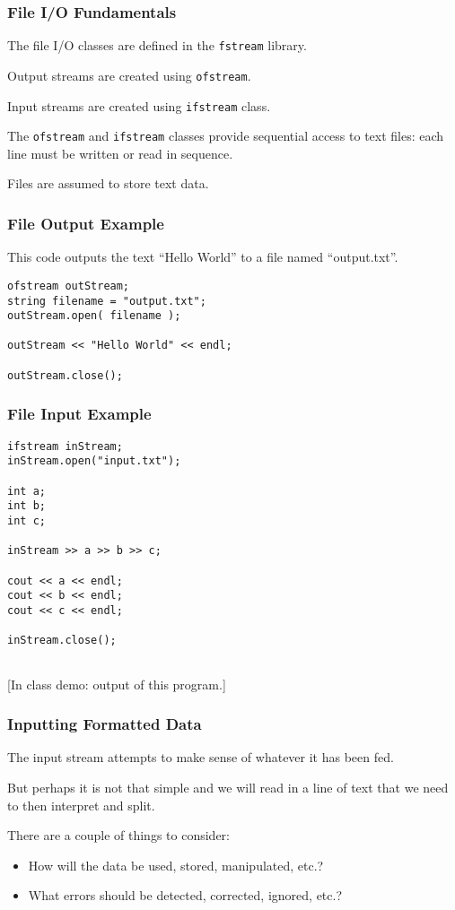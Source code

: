 \begin{frame}
\frametitle{File I/O Fundamentals}

The file I/O classes are defined in the \texttt{fstream} library.

Output streams are created using \texttt{ofstream}.

Input streams are created using \texttt{ifstream} class.

The \texttt{ofstream} and \texttt{ifstream} classes provide sequential access to text files: each line must be written or read in sequence.

Files are assumed to store text data.

\end{frame}


\begin{frame}[fragile]
\frametitle{File Output Example}

This code outputs the text ``Hello World'' to a file named ``output.txt''.

{\scriptsize
\begin{verbatim}
ofstream outStream; 
string filename = "output.txt";
outStream.open( filename );

outStream << "Hello World" << endl;

outStream.close();

\end{verbatim}
}

\end{frame}



\begin{frame}[fragile]
\frametitle{File Input Example}

{\scriptsize
\begin{verbatim}
ifstream inStream;
inStream.open("input.txt");

int a;
int b;
int c;

inStream >> a >> b >> c;

cout << a << endl;
cout << b << endl;
cout << c << endl;

inStream.close();
 
\end{verbatim}
}

[In class demo: output of this program.]

\end{frame}


\begin{frame}
\frametitle{Inputting Formatted Data}

The input stream attempts to make sense of whatever it has been fed.

But perhaps it is not that simple and we will read in a line of text that we need to then interpret and split.

There are a couple of things to consider:
\begin{itemize}
    \item How will the data be used, stored, manipulated, etc.?
    \item What errors should be detected, corrected, ignored, etc.?
\end{itemize}

\end{frame}


